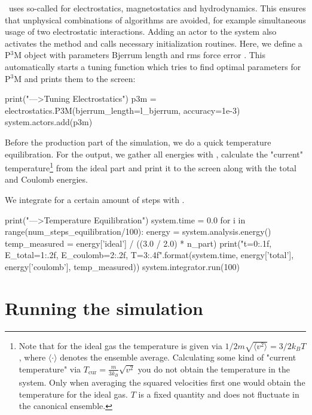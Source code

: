 \documentclass[
a4paper,                        %
11pt,                           %
twoside,                        %
footsepline,                    %
headsepline,                    %
headexclude,                    %
footexclude,                    %
pagesize,                       %
]{scrartcl}
\begin{document}
\es\ uses so-called  for electrostatics, magnetostatics and
hydrodynamics. This ensures that unphysical combinations of algorithms are
avoided, for example simultaneous usage of two electrostatic interactions.
Adding an actor to the system also activates the method and calls necessary
initialization routines. Here, we define a P$^3$M object with parameters Bjerrum
length and rms force error . This automatically starts a
tuning function which tries to find optimal parameters for P$^3$M and prints them
to the screen:

\begin{pypresso}
print("\n--->Tuning Electrostatics")
p3m = electrostatics.P3M(bjerrum_length=l_bjerrum, 
                         accuracy=1e-3)
system.actors.add(p3m)
\end{pypresso}

Before the production part of the simulation, we do a quick temperature 
equilibration. For the output, we gather all energies with
, calculate the "current" temperature\footnote{Note that for the ideal gas the temperature is given via $1/2 m \sqrt{\langle v^2 \rangle}=3/2 k_BT$, where $\langle \cdot \rangle$ denotes the ensemble average. Calculating some kind of "current temperature" via $T_\text{cur}=\frac{m}{3 k_B} \sqrt{ v^2 }$ you do not obtain the temperature in the system. Only when averaging the squared velocities first one would obtain the temperature for the ideal gas. $T$ is a fixed quantity and does not fluctuate in the canonical ensemble.} from the ideal part and 
print it to the screen along with the total and Coulomb energies.

We integrate for a certain amount of steps with .

\begin{pypresso}
print("\n--->Temperature Equilibration")
system.time = 0.0
for i in range(num_steps_equilibration/100):
    energy = system.analysis.energy()
    temp_measured = energy['ideal'] / ((3.0 / 2.0) * n_part)
    print("t={0:.1f}, E_total={1:.2f}, E_coulomb={2:.2f}, 
          T={3:.4f}".format(system.time, energy['total'], 
          energy['coulomb'], temp_measured))
    system.integrator.run(100)
\end{pypresso}

\section{Running the simulation}
\end{document}
